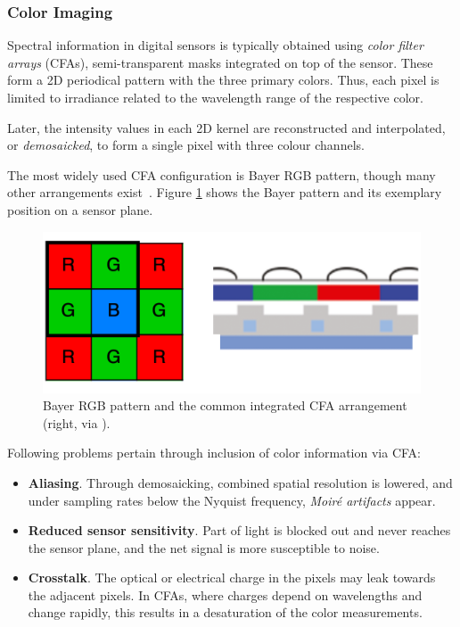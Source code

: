\subsubsection{Color Imaging}

Spectral information in digital sensors is typically obtained using \textit{color filter arrays} (CFAs), semi-transparent masks integrated on top of the sensor. These form a 2D periodical pattern with the three primary colors. Thus, each pixel is limited to irradiance related to the wavelength range of the respective color.

Later, the intensity values in each 2D kernel are reconstructed and interpolated, or \textit{demosaicked}, to form a single pixel with three colour channels.

The most widely used CFA configuration is Bayer RGB pattern, though many other arrangements exist~\cite{Krig2014}. Figure \ref{fig:cfabayer} shows the Bayer pattern and its exemplary position on a sensor plane.

\begin{figure}[h]
  \centering
  \includegraphics[width=0.8\linewidth]{imgs/cfabayer.png}
  \caption{Bayer RGB pattern and the common integrated CFA arrangement (right, via \cite{Krig2014}).}
  \label{fig:cfabayer}
\end{figure}

Following problems pertain through inclusion of color information via CFA:

\begin{itemize}

\item \textbf{Aliasing}. Through demosaicking, combined spatial resolution is lowered, and under sampling rates below the Nyquist frequency, \textit{Moiré artifacts} appear.

\item \textbf{Reduced sensor sensitivity}. Part of light is blocked out and never reaches the sensor plane, and the net signal is more susceptible to noise.

\item \textbf{Crosstalk}. The optical or electrical charge in the pixels may leak towards the adjacent pixels. In CFAs, where charges depend on wavelengths and change rapidly, this results in a desaturation of the color measurements.
\end{itemize}

